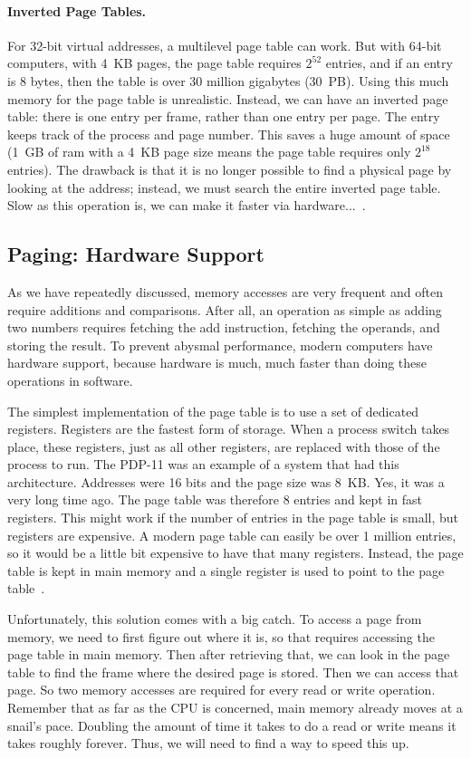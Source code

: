 \paragraph{Inverted Page Tables.} 
For 32-bit virtual addresses, a multilevel page table can work. But with 64-bit computers, with 4~KB pages, the page table requires $2^{52}$ entries, and if an entry is 8 bytes, then the table is over 30 million gigabytes (30~PB). Using this much memory for the page table is unrealistic. Instead, we can have an inverted page table: there is one entry per frame, rather than one entry per page. The entry keeps track of the process and page number. This saves a huge amount of space (1~GB of ram with a 4~KB page size means the page table requires only $2^{18}$ entries). The drawback is that it is no longer possible to find a physical page by looking at the address; instead, we must search the entire inverted page table. Slow as this operation is, we can make it faster via hardware...~\cite{mos}.

\subsection*{Paging: Hardware Support}
As we have repeatedly discussed, memory accesses are very frequent and often require additions and comparisons. After all, an operation as simple as adding two numbers requires fetching the add instruction, fetching the operands, and storing the result. To prevent abysmal performance, modern computers have hardware support, because hardware is much, much faster than doing these operations in software.

The simplest implementation of the page table is to use a set of dedicated registers. Registers are the fastest form of storage. When a process switch takes place, these registers, just as all other registers, are replaced with those of the process to run. The PDP-11 was an example of a system that had this architecture. Addresses were 16 bits and the page size was 8~KB. Yes, it was a very long time ago. The page table was therefore 8 entries and kept in fast registers. This might work if the number of entries in the page table is small, but registers are expensive. A modern page table can easily be over 1 million entries, so it would be a little bit expensive to have that many registers. Instead, the page table is kept in main memory and a single register is used to point to the page table~\cite{osc}.

Unfortunately, this solution comes with a big catch. To access a page from memory, we need to first figure out where it is, so that requires accessing the page table in main memory. Then after retrieving that, we can look in the page table to find the frame where the desired page is stored. Then we can access that page. So two memory accesses are required for every read or write operation. Remember that as far as the CPU is concerned, main memory already moves at a snail's pace. Doubling the amount of time it takes to do a read or write means it takes roughly forever. Thus, we will need to find a way to speed this up.

